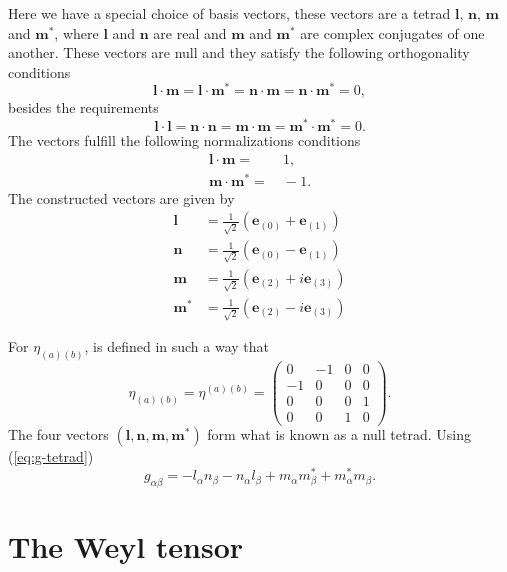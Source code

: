 Here we have a special choice of basis vectors, these vectors are
a tetrad $\boldsymbol{l}$, $\boldsymbol{n}$, $\boldsymbol{m}$ and
$\boldsymbol{m}^{*}$, where $\boldsymbol{l}$ and $\boldsymbol{n}$
are real and $\boldsymbol{m}$ and $\boldsymbol{m}^{*}$ are complex
conjugates of one another. These vectors are null and they satisfy
the following orthogonality conditions
\[
\boldsymbol{l}\cdot\boldsymbol{m}=\boldsymbol{l}\cdot\boldsymbol{m}^{*}=\boldsymbol{n}\cdot\boldsymbol{m}=\boldsymbol{n}\cdot\boldsymbol{m}^{*}=0,
\]
besides the requirements
\[
\boldsymbol{l}\cdot\boldsymbol{l}=\boldsymbol{n}\cdot\boldsymbol{n}=\boldsymbol{m}\cdot\boldsymbol{m}=\boldsymbol{m}^{*}\cdot\boldsymbol{m}^{*}=0.
\]
The vectors fulfill the following normalizations conditions
\begin{align*}
\boldsymbol{l}\cdot\boldsymbol{m}= & \ 1,\\
\boldsymbol{m}\cdot\boldsymbol{m}^{*}= & \ -1.
\end{align*}
The constructed vectors are given by
\begin{align}
\boldsymbol{l} & =\frac{1}{\sqrt{2}}\left(\boldsymbol{e}_{(0)}+\boldsymbol{e}_{(1)}\right)\label{eq:tetrad-l}\\
\boldsymbol{n} & =\frac{1}{\sqrt{2}}\left(\boldsymbol{e}_{(0)}-\boldsymbol{e}_{(1)}\right)\label{eq:tetrad-n}\\
\boldsymbol{m} & =\frac{1}{\sqrt{2}}\left(\boldsymbol{e}_{(2)}+i\boldsymbol{e}_{(3)}\right)\label{eq:tetrad-m}\\
\boldsymbol{m}^{*} & =\frac{1}{\sqrt{2}}\left(\boldsymbol{e}_{(2)}-i\boldsymbol{e}_{(3)}\right)\label{eq:tetrad-m2}
\end{align}

For $\eta_{(a)(b)}$, is defined in such a way that
\[
\eta_{(a)(b)}=\eta^{(a)(b)}=\left(\begin{array}{cccc}
0 & -1 & 0 & 0\\
-1 & 0 & 0 & 0\\
0 & 0 & 0 & 1\\
0 & 0 & 1 & 0
\end{array}\right).
\]
The four vectors $\left(\boldsymbol{l},\boldsymbol{n},\boldsymbol{m},\boldsymbol{m}^{*}\right)$
form what is known as a null tetrad. Using (\ref{eq:g-tetrad})
\[
g_{\alpha\beta}=-l_{\alpha}n_{\beta}-n_{\alpha}l_{\beta}+m_{\alpha}m_{\beta}^{*}+m_{\alpha}^{*}m_{\beta}.
\]

\section{The Weyl tensor}

